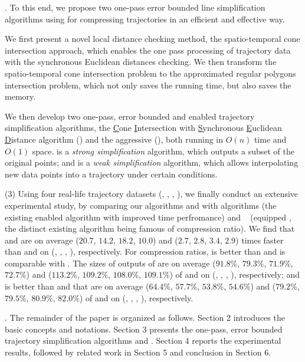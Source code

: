 .
To this end, we propose two one-pass error bounded line simplification algorithms using \sed for compressing trajectories in an efficient and effective way.

 We first present a novel local distance checking method, \ie the spatio-temporal cone intersection approach, which enables the one pass processing of trajectory data with the synchronous Euclidean distances checking. We then transform the spatio-temporal cone intersection problem to the approximated regular polygons intersection problem, which not only saves the running time, but also saves the memory.

 We then develop two one-pass, error bounded and \sed enabled trajectory simplification algorithms, \ie the \underline{C}one \underline{I}ntersection with \underline{S}ynchronous \underline{E}uclidean \underline{D}istance algorithm (\cist) and the aggressive \cist (\cista), both running in $O(n)$ time and $O(1)$ space.
\cist is a \emph{strong simplification}\cite{Trajcevski:DDR} algorithm, which outputs a subset of the original points;
and \cista is a \emph{weak simplification}\cite{Trajcevski:DDR} algorithm, which allows interpolating new data points into a trajectory under certain conditions.


\stab (3) Using four real-life trajectory datasets (\truck, \sercar, \geolife, \pricar),
we finally conduct an extensive experimental study, by comparing our algorithms \cist and \cista with algorithms \squishe \cite{Muckell:Compression} (the existing \sed enabled \lsa algorithm with improved time perfromance) and \dps~\cite{Meratnia:Spatiotemporal} (\sed equipped \dpa, the distinct existing \lsa algorithm being famous of compression ratio).
%
We find that \cist and \cista are on average ($20.7$, $14.2$, $18.2$, $10.0$) and ($2.7$, $2.8$, $3.4$, {$2.9$}) times faster than \dps and \squishe on (\truck, \sercar, \geolife, \pricar), respectively.
%
For compression ratios, \cist is better than \squishe and is comparable with \dps. The sizes of outputs of \cist are on average ($91.8\%$, $79.3\%$, $71.9\%$, {$72.7\%$}) and ($113.2\%$, $109.2\%$, $108.0\%$, $109.1\%$) of \squishe and \dps on (\truck, \sercar, \geolife, \pricar), respectively; and \cista is better than \squishe and \dps that are on average ($64.4\%$, $57.7\%$, $53.8\%$, {$54.6\%$}) and ($79.2\%$, $79.5\%$, $80.9\%$, $82.0\%$) of \squishe and \dps on (\truck, \sercar, \geolife, \pricar), respectively.


.
The remainder of the paper is organized as follows.
Section 2 introduces the basic concepts and notations.
Section 3 presents the one-pass, error bounded trajectory simplification algorithms \cist and \cista.
Section 4 reports the experimental results, followed by related work in
Section 5 and conclusion in Section 6.







